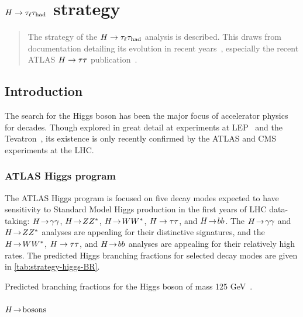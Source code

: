 \chapter[$\Htautaulh$ strategy][$\Htautaulh$ strategy]{$\Htautaulh$ strategy}
\label{chap:strategy}

\begin{quote}
  The strategy of the $\Htautaulh$ analysis is described. This draws from documentation detailing its evolution in recent years~\cite{ATLAS-CONF-2012-160,ATLAS-CONF-2013-108}, especially the recent ATLAS $H\rightarrow\tau\tau$ publication~\cite{HIGG-2013-32}.
\end{quote}

\section{Introduction}
\label{sec:strategy-introduction}

The search for the Higgs boson has been the major focus of accelerator physics for decades. Though explored in great detail at experiments at LEP~\cite{2003.lep-higgs} and the Tevatron~\cite{2013.tevatron-higgs}, its existence is only recently confirmed by the ATLAS and CMS experiments at the LHC.

\subsection{ATLAS Higgs program}
\label{sec:strategy-higgs}

The ATLAS Higgs program is focused on five decay modes expected to have sensitivity to Standard Model Higgs production in the first years of LHC data-taking: $H \!\rightarrow\! \gamma\gamma$, $H \!\rightarrow\! ZZ^\ast$, $H \!\rightarrow\! WW^\ast$, $H\rightarrow\tau\tau$, and $H \!\rightarrow\! bb$. The $H \!\rightarrow\! \gamma\gamma$ and $H \!\rightarrow\! ZZ^\ast$ analyses are appealing for their distinctive signatures, and the $H \!\rightarrow\! WW^\ast$, $H\rightarrow\tau\tau$, and $H \!\rightarrow\! bb$ analyses are appealing for their relatively high rates. The predicted Higgs branching fractions for selected decay modes are given in \cref{tab:strategy-higgs-BR}.

\begin{table}[bp]
  \centering
  \renewcommand{\arraystretch}{1.4}
  \caption{Predicted branching fractions for the Higgs boson of mass 125 GeV~\cite{higgs-branchingfractions}.}
  
  \label{tab:strategy-higgs-BR}
\end{table}

\subsubsection{$H \!\rightarrow\! \text{bosons}$}

